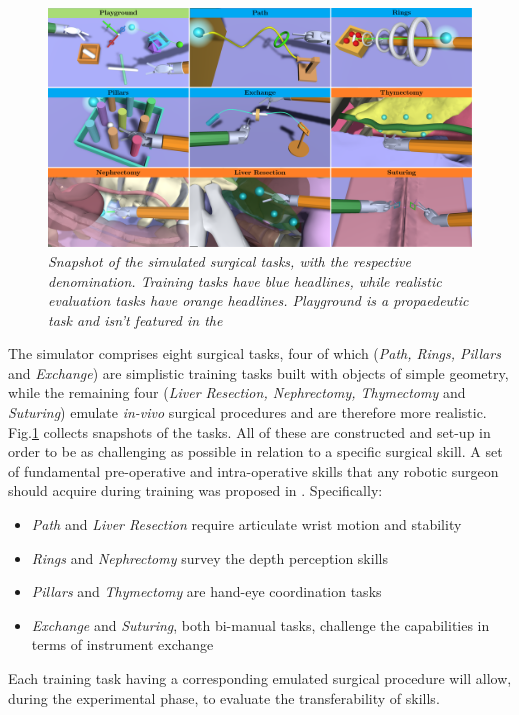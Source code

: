 \documentclass{article}
\begin{document}
\begin{multicols}{2}
\begin{figure}
  \centering
      \includegraphics[width=\linewidth]{images/PANEL_named.png}
      \small{
      \caption{\textit{Snapshot of the simulated surgical tasks, with the respective denomination. Training tasks have blue headlines, while realistic evaluation tasks have orange headlines. \textit{Playground} is a propaedeutic task and isn't featured in the}}}
      \label{fig:taskspanel}
\end{figure}

The simulator comprises eight surgical tasks, four of which (\textit{Path, Rings, Pillars} and \textit{Exchange}) are simplistic training tasks built with objects of simple geometry, while the remaining four (\textit{Liver Resection, Nephrectomy, Thymectomy} and \textit{Suturing}) emulate \textit{in-vivo} surgical procedures and are therefore more realistic. Fig.\ref{fig:taskspanel} collects snapshots of the tasks. All of these are constructed and set-up in order to be as challenging as possible in relation to a specific surgical skill. A set of fundamental pre-operative and intra-operative skills that any robotic surgeon should acquire during training was proposed in \cite{Smith2014}. Specifically:
\begin{itemize}
  \item \textit{Path} and \textit{Liver Resection} require articulate wrist motion and stability
  \item \textit{Rings} and \textit{Nephrectomy} survey the depth perception skills
  \item \textit{Pillars} and \textit{Thymectomy} are hand-eye coordination tasks
  \item \textit{Exchange} and \textit{Suturing}, both bi-manual tasks, challenge the capabilities in terms of instrument exchange 
\end{itemize}
Each training task having a corresponding emulated surgical procedure will allow, during the experimental phase, to evaluate the transferability of skills.


\end{multicols}
\end{document}
